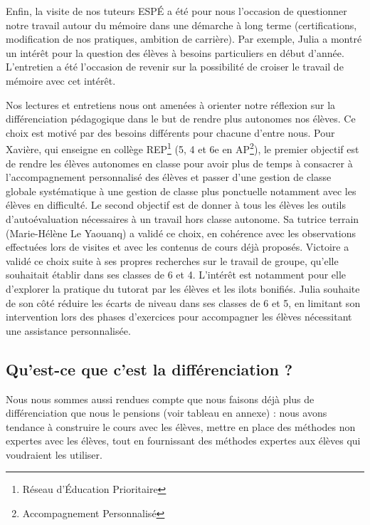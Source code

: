 Enfin, la visite de nos tuteurs ESPÉ a été pour nous l’occasion de questionner notre travail autour du mémoire dans une démarche à long terme (certifications, modification de nos pratiques, ambition de carrière). Par exemple, Julia a montré un intérêt pour la question des élèves à besoins particuliers en début d’année. L’entretien a été l’occasion de revenir sur la possibilité de croiser le travail de mémoire avec cet intérêt.

Nos lectures et entretiens nous ont amenées à orienter notre réflexion sur la différenciation pédagogique dans le but de rendre plus autonomes nos élèves. Ce choix est motivé par des besoins différents pour chacune d’entre nous. Pour Xavière, qui enseigne en collège REP\footnote{Réseau d'Éducation Prioritaire} (5, 4 et 6{e} en AP\footnote{Accompagnement Personnalisé}),  le premier objectif est de rendre les élèves autonomes en classe pour avoir plus de temps à consacrer à l’accompagnement personnalisé des élèves et passer d’une gestion de classe globale systématique à une gestion de classe plus ponctuelle notamment avec les élèves en difficulté. Le second objectif est de donner à tous les élèves les outils d’autoévaluation nécessaires à un travail hors classe autonome. Sa tutrice terrain (Marie-Hélène Le Yaouanq) a validé ce choix, en cohérence avec les observations effectuées lors de visites et avec les contenus de cours déjà proposés. Victoire a validé ce choix suite à ses propres recherches sur le travail de groupe, qu’elle souhaitait établir dans ses classes de 6 et 4. L’intérêt est notamment pour elle d’explorer la pratique du tutorat par les élèves et les ilots bonifiés. Julia souhaite de son côté réduire les écarts de niveau dans ses classes de 6 et 5, en limitant son intervention lors des phases d’exercices pour accompagner les élèves nécessitant une assistance personnalisée.

\subsection{Qu'est-ce que c'est la différenciation ?}


Nous nous sommes aussi rendues compte que nous faisons déjà plus de différenciation que nous le pensions (voir tableau en annexe) : nous avons tendance à construire le cours avec les élèves, mettre en place des méthodes non expertes avec les élèves, tout en fournissant des méthodes expertes aux élèves qui voudraient les utiliser.


